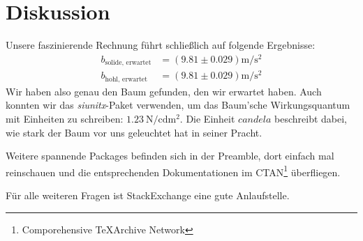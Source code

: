 \section{Diskussion}

Unsere faszinierende Rechnung führt schließlich auf folgende Ergebnisse:
\begin{align}
    b_\text{solide, erwartet}
     & = (9.81 \pm 0.029) \unit{\m \per \s^2} \\
    b_\text{hohl, erwartet}
     & = (9.81 \pm 0.029) \unit{\m \per \s^2}
\end{align}
Wir haben also genau den Baum gefunden, den wir erwartet haben. Auch konnten wir das \textit{siunitx}-Paket verwenden, um das Baum'sche Wirkungsquantum mit Einheiten zu schreiben: $\qty{1.23}{\N\per \candela \m^2}$. Die Einheit $\unit{candela}$ beschreibt dabei, wie stark der Baum vor uns geleuchtet hat in seiner Pracht.

Weitere spannende Packages befinden sich in der Preamble, dort einfach mal reinschauen und die entsprechenden Dokumentationen im CTAN\footnote{Comporehensive \TeX Archive Network} überfliegen.

Für alle weiteren Fragen ist StackExchange eine gute Anlaufstelle.
